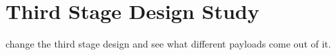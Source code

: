 
\chapter{Third Stage Design Study}

change the third stage design and see what different payloads come out of it. 